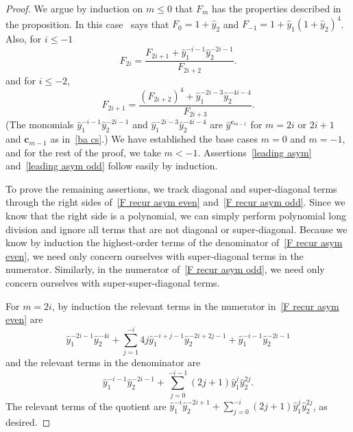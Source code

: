\documentclass[10pt,a4paper]{amsart}
\theoremstyle{definition}
\newcommand{\cc}{\mathbf{c}}
\newcommand{\hy}{\hat{y}}
\begin{document}
\begin{proof}
We argue by induction on $m\le0$ that $F_m$ has the properties described in the proposition.
In this case~\cite[Proposition~5.1]{ca4} says that $F_0=1+\hy_2$ and ${F_{-1}=1+\hy_1(1+\hy_2)^4}$.
Also, for $i\le -1$
\begin{equation}\label{F recur asym even}
F_{2i}=\frac{F_{2i+1}+\hy_1^{-i-1}\hy_2^{-2i-1}}{F_{2i+2}}.
\end{equation}
and for $i\le-2$,
\begin{equation}\label{F recur asym odd}
F_{2i+1}=\frac{(F_{2i+2})^4+\hy_1^{-2i-3}\hy_2^{-4i-4}}{F_{2i+3}}.
\end{equation}
(The monomials $\hy_1^{-i-1}\hy_2^{-2i-1}$ and $\hy_1^{-2i-3}\hy_2^{-4i-4}$ are $\hy^{\cc_{m-1}}$ for $m=2i$ or $2i+1$ and $\cc_{m-1}$ as in~\eqref{ba cs}.)
We have established the base cases $m=0$ and $m=-1$, and for the rest of the proof, we take $m<-1$.
Assertions~\ref{leading asym} and~\ref{leading asym odd} follow easily by induction.

To prove the remaining assertions, we track diagonal and super-diagonal terms through the right sides of~\eqref{F recur asym even} and~\eqref{F recur asym odd}.
Since we know that the right side is a polynomial, we can simply perform polynomial long division and ignore all terms that are not diagonal or super-diagonal.
Because we know by induction the highest-order terms of the denominator of~\eqref{F recur asym even}, we need only concern ourselves with super-diagonal terms in the numerator.
Similarly, in the numerator of~\eqref{F recur asym odd}, we need only concern ourselves with super-super-diagonal terms.

For $m=2i$, by induction the relevant terms in the numerator in~\eqref{F recur asym even} are 
\begin{equation}\label{even numer}
\hy_1^{-2i-1}\hy_2^{-4i}+\sum_{j=1}^{-i}4j\hy_1^{-i+j-1}\hy_2^{-2i+2j-1}+\hy_1^{-i-1}\hy_2^{-2i-1}
\end{equation}
and the relevant terms in the denominator are
\begin{equation}\label{even denom}
\hy_1^{-i-1}\hy_2^{-2i-1}+\sum_{j=0}^{-i-1}(2j+1)\hy_1^j\hy_2^{2j}.
\end{equation}
The relevant terms of the quotient are $\hy_1^{-i}\hy_2^{-2i+1}+\sum_{j=0}^{-i}(2j+1)\hy_1^j\hy_2^{2j}$, as desired.


\end{proof}
\end{document}
